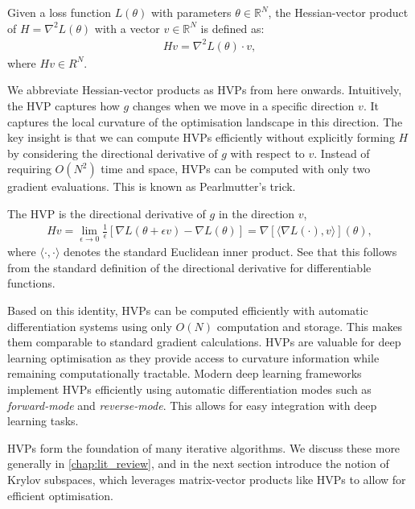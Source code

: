 \begin{definition}
    Given a loss function $L(\theta)$ with parameters $\theta \in \mathbb{R}^N$, the Hessian-vector product of $H = \nabla^2 L(\theta)$ with a vector $v \in \mathbb{R}^N$ is defined as:
    \begin{align}
        Hv = \nabla^2 L(\theta) \cdot v, 
    \end{align}
    where $Hv \in R^N$.
\end{definition}
We abbreviate Hessian-vector products as HVPs from here onwards. Intuitively, the HVP captures how $g$ changes when we move in a specific direction $v$. It captures the local curvature of the optimisation landscape in this direction. The key insight is that we can compute HVPs efficiently without explicitly forming $H$ by considering the directional derivative of $g$ with respect to $v$. Instead of requiring $O(N^2)$ time and space, HVPs can be computed with only two gradient evaluations. This is known as Pearlmutter's trick.

\begin{definition} The HVP is the directional derivative of $g$ in the direction $v$,
\begin{align}
    Hv = \lim_{\epsilon \to 0} \frac{1}{\epsilon}[\nabla L(\theta + \epsilon v) - \nabla L(\theta)] = \nabla[\langle\nabla L(\cdot), v\rangle](\theta), 
\end{align} 
where $\langle \cdot, \cdot \rangle$ denotes the standard Euclidean inner product. See that this follows from the standard definition of the directional derivative for differentiable functions.
\end{definition}
Based on this identity, HVPs can be computed efficiently with automatic differentiation systems using only $O(N)$ computation and storage. This makes them comparable to standard gradient calculations. HVPs are valuable for deep learning optimisation as they provide access to curvature information while remaining computationally tractable. Modern deep learning frameworks implement HVPs efficiently using automatic differentiation modes such as \textit{forward-mode} and \textit{reverse-mode}. This allows for easy integration with deep learning tasks.

HVPs form the foundation of many iterative algorithms. We discuss these more generally in \cref{chap:lit_review}, and in the next section introduce the notion of Krylov subspaces, which leverages matrix-vector products like HVPs to allow for efficient optimisation.

